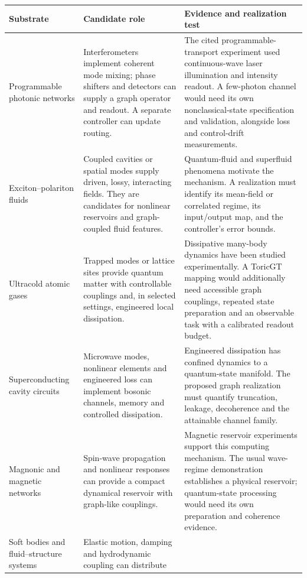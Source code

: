\begin{longtable}{p{}p{}p{}}
\toprule
Substrate & Candidate role & Evidence and realization test\\\midrule
\endhead
Programmable photonic networks &
Interferometers implement coherent mode mixing; phase shifters and
detectors can supply a graph operator and readout. A separate controller
can update routing. &
The cited programmable-transport experiment used continuous-wave laser
illumination and intensity readout. A few-photon channel would need its
own nonclassical-state specification and validation, alongside loss and
control-drift measurements.
\cite{qtsHarris2017}\\[6pt]
Exciton--polariton fluids &
Coupled cavities or spatial modes supply driven, lossy, interacting
fields. They are candidates for nonlinear reservoirs and graph-coupled
fluid features. &
Quantum-fluid and superfluid phenomena motivate the mechanism. A
realization must identify its mean-field or correlated regime, its
input/output map, and the controller's error bounds.
\cite{qtsCarusottoCiuti2013,qtsAmo2009}\\[6pt]
Ultracold atomic gases &
Trapped modes or lattice sites provide quantum matter with controllable
couplings and, in selected settings, engineered local dissipation. &
Dissipative many-body dynamics have been studied experimentally. A
ToricGT mapping would additionally need accessible graph couplings,
repeated state preparation and an observable task with a calibrated
readout budget.\cite{qtsBarontini2013}\\[6pt]
Superconducting cavity circuits &
Microwave modes, nonlinear elements and engineered loss can implement
bosonic channels, memory and controlled dissipation. &
Engineered dissipation has confined dynamics to a quantum-state manifold.
The proposed graph realization must quantify truncation, leakage,
decoherence and the attainable channel family.\cite{qtsLeghtas2015}\\[6pt]
Magnonic and magnetic networks &
Spin-wave propagation and nonlinear responses can provide a compact
dynamical reservoir with graph-like couplings. &
Magnetic reservoir experiments support this computing mechanism. The
usual wave-regime demonstration establishes a physical reservoir;
quantum-state processing would need its own preparation and coherence
evidence.\cite{qtsNamiki2023}\\[6pt]
Soft bodies and fluid--structure systems &
Elastic motion, damping and hydrodynamic coupling can distribute

\end{longtable}
